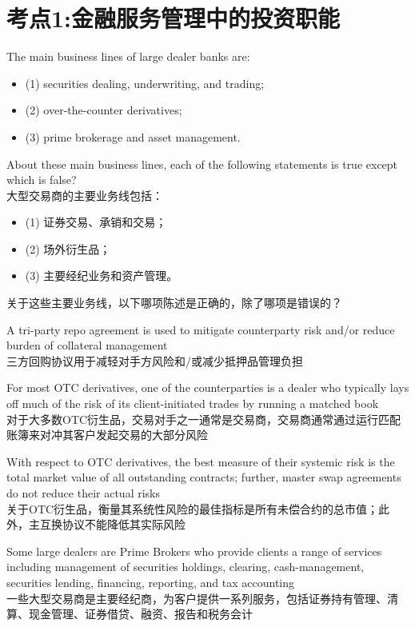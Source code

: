 \documentclass{article}
\newcounter{question} %
\begin{document}
 \tableofcontents %
\newpage




\section{考点1:金融服务管理中的投资职能}
\setcounter{question}{0}

\begin{question}
    The main business lines of large dealer banks are: 
    \begin{itemize}
        \item (1) securities dealing, underwriting, and trading; 
        \item (2) over-the-counter derivatives; 
        \item (3) prime brokerage and asset management. 
    \end{itemize}
    About these main business lines, each of the following statements is true except which is false?
    \\大型交易商的主要业务线包括：
    \begin{itemize}
        \item (1) 证券交易、承销和交易；
        \item (2) 场外衍生品；
        \item (3) 主要经纪业务和资产管理。
    \end{itemize}
    关于这些主要业务线，以下哪项陈述是正确的，除了哪项是错误的？
\end{question}

\begin{choices}
    \item A tri-party repo agreement is used to mitigate counterparty risk and/or reduce burden of collateral management\\
    三方回购协议用于减轻对手方风险和/或减少抵押品管理负担
    \item For most OTC derivatives, one of the counterparties is a dealer who typically lays off much of the risk of its client-initiated trades by running a matched book\\
    对于大多数OTC衍生品，交易对手之一通常是交易商，交易商通常通过运行匹配账簿来对冲其客户发起交易的大部分风险
    \item With respect to OTC derivatives, the best measure of their systemic risk is the total market value of all outstanding contracts; further, master swap agreements do not reduce their actual risks\\
    关于OTC衍生品，衡量其系统性风险的最佳指标是所有未偿合约的总市值；此外，主互换协议不能降低其实际风险
    \item Some large dealers are Prime Brokers who provide clients a range of services including management of securities holdings, clearing, cash-management, securities lending, financing, reporting, and tax accounting\\
    一些大型交易商是主要经纪商，为客户提供一系列服务，包括证券持有管理、清算、现金管理、证券借贷、融资、报告和税务会计
\end{choices}
\end{document}
